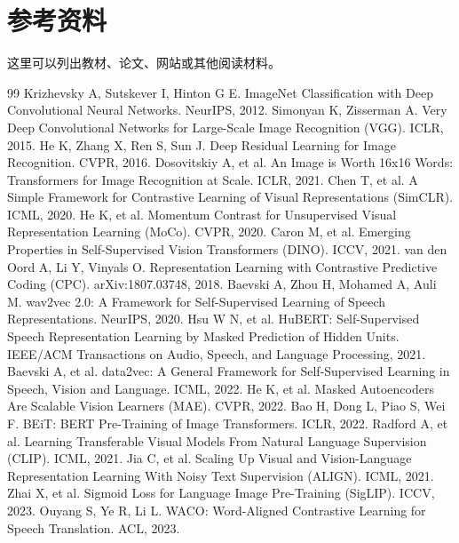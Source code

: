 \documentclass[UTF8,a4paper,zihao=-4,oneside,openany]{ctexbook}
\begin{document}
\backmatter
\chapter{参考资料}

这里可以列出教材、论文、网站或其他阅读材料。

\begin{thebibliography}{99}
   Krizhevsky A, Sutskever I, Hinton G E. ImageNet Classification with Deep Convolutional Neural Networks. NeurIPS, 2012.
   Simonyan K, Zisserman A. Very Deep Convolutional Networks for Large-Scale Image Recognition (VGG). ICLR, 2015.
   He K, Zhang X, Ren S, Sun J. Deep Residual Learning for Image Recognition. CVPR, 2016.
   Dosovitskiy A, et al. An Image is Worth 16x16 Words: Transformers for Image Recognition at Scale. ICLR, 2021.
   Chen T, et al. A Simple Framework for Contrastive Learning of Visual Representations (SimCLR). ICML, 2020.
   He K, et al. Momentum Contrast for Unsupervised Visual Representation Learning (MoCo). CVPR, 2020.
   Caron M, et al. Emerging Properties in Self-Supervised Vision Transformers (DINO). ICCV, 2021.
   van den Oord A, Li Y, Vinyals O. Representation Learning with Contrastive Predictive Coding (CPC). arXiv:1807.03748, 2018.
   Baevski A, Zhou H, Mohamed A, Auli M. wav2vec 2.0: A Framework for Self-Supervised Learning of Speech Representations. NeurIPS, 2020.
   Hsu W N, et al. HuBERT: Self-Supervised Speech Representation Learning by Masked Prediction of Hidden Units. IEEE/ACM Transactions on Audio, Speech, and Language Processing, 2021.
   Baevski A, et al. data2vec: A General Framework for Self-Supervised Learning in Speech, Vision and Language. ICML, 2022.
   He K, et al. Masked Autoencoders Are Scalable Vision Learners (MAE). CVPR, 2022.
   Bao H, Dong L, Piao S, Wei F. BEiT: BERT Pre-Training of Image Transformers. ICLR, 2022.
   Radford A, et al. Learning Transferable Visual Models From Natural Language Supervision (CLIP). ICML, 2021.
   Jia C, et al. Scaling Up Visual and Vision-Language Representation Learning With Noisy Text Supervision (ALIGN). ICML, 2021.
   Zhai X, et al. Sigmoid Loss for Language Image Pre-Training (SigLIP). ICCV, 2023.
   Ouyang S, Ye R, Li L. WACO: Word-Aligned Contrastive Learning for Speech Translation. ACL, 2023.

\end{thebibliography}
\end{document}
